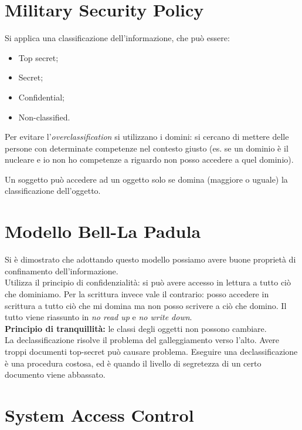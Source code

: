 \section{Military Security Policy}

Si applica una classificazione dell'informazione, che può essere:
\begin{itemize}
 \item Top secret;
 \item Secret;
 \item Confidential;
 \item Non-classified.
\end{itemize}

Per evitare l'\textit{overclassification} si utilizzano i domini: si cercano di 
mettere delle persone con determinate competenze nel contesto giusto (es. se un 
dominio è il nucleare e io non ho competenze a riguardo non posso accedere a 
quel dominio).

Un soggetto può accedere ad un oggetto solo se domina (maggiore o uguale) la 
classificazione dell'oggetto.

\section{Modello Bell-La Padula}

Si è dimostrato che adottando questo modello possiamo avere buone proprietà di
confinamento dell'informazione.\\
Utilizza il principio di confidenzialità: si può avere accesso in lettura a
tutto ciò che dominiamo. Per la scrittura invece vale il contrario: posso
accedere in scrittura a tutto ciò che mi domina ma non posso scrivere a ciò che
domino. Il tutto viene riassunto in \textit{no read up} e \textit{no write
down}.\\
\newline
\textbf{Principio di tranquillità:} le classi degli oggetti non possono cambiare.\\
\newline
La declassificazione risolve il problema del galleggiamento verso l'alto. Avere
troppi documenti top-secret può causare problema. Eseguire una
declassificazione è una procedura costosa, ed è quando il livello di segretezza
di un certo documento viene abbassato.

\section{System Access Control}

